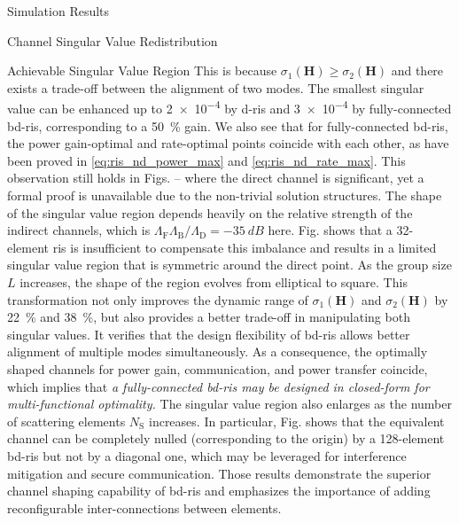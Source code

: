 \documentclass[journal]{IEEEtran}
\begin{document}
\begin{section}{Simulation Results}
\begin{subsection}{Channel Singular Value Redistribution}
\begin{subsubsection}{Achievable Singular Value Region}
			This is because $\sigma_1(\mathbf{H}) \ge \sigma_2(\mathbf{H})$ and there exists a trade-off between the alignment of two modes.
			The smallest singular value can be enhanced up to \num{2e-4} by \gls{d}-\gls{ris} and \num{3e-4} by fully-connected \gls{bd}-\gls{ris}, corresponding to a \qty{50}{\percent} gain.
			We also see that for fully-connected \gls{bd}-\gls{ris}, the power gain-optimal and rate-optimal points coincide with each other, as have been proved in  \eqref{eq:ris_nd_power_max} and \eqref{eq:ris_nd_rate_max}.
			This observation still holds in Figs.  --  where the direct channel is significant, yet a formal proof is unavailable due to the non-trivial solution structures.
			The shape of the singular value region depends heavily on the relative strength of the indirect channels, which is $\Lambda_\mathrm{F}\Lambda_\mathrm{B}/\Lambda_\mathrm{D}=\qty{-35}{dB}$ here.
			Fig.  shows that a 32-element \gls{ris} is insufficient to compensate this imbalance and results in a limited singular value region that is symmetric around the direct point.
			As the group size $L$ increases, the shape of the region evolves from elliptical to square.
			This transformation not only improves the dynamic range of $\sigma_1(\mathbf{H})$ and $\sigma_2(\mathbf{H})$ by \qty{22}{\percent} and \qty{38}{\percent}, but also provides a better trade-off in manipulating both singular values.
			It verifies that the design flexibility of \gls{bd}-\gls{ris} allows better alignment of multiple modes simultaneously.
			As a consequence, {the optimally shaped channels for power gain, communication, and power transfer coincide,} which implies that \emph{a fully-connected \gls{bd}-\gls{ris} may be designed in closed-form for multi-functional optimality.}
			The singular value region also enlarges as the number of scattering elements $N_\mathrm{S}$ increases.
			In particular, Fig.  shows that the equivalent channel can be completely nulled (corresponding to the origin) by a 128-element \gls{bd}-\gls{ris} but not by a diagonal one, which may be leveraged for interference mitigation and secure communication.
			Those results demonstrate the superior channel shaping capability of \gls{bd}-\gls{ris} and emphasizes the importance of adding reconfigurable inter-connections between elements.
		\end{subsubsection}


\end{subsection}
\end{section}
\end{document}
